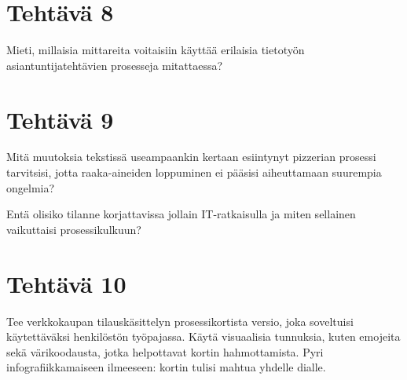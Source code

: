 \documentclass[
  finnish,
  letterpaper,
  DIV=11,
  numbers=noendperiod,
  oneside]{scrreprt}
\begin{document}
\section{Tehtävä 8}\label{tehtuxe4vuxe4-8}

Mieti, millaisia mittareita voitaisiin käyttää erilaisia tietotyön
asiantuntijatehtävien prosesseja mitattaessa?

\section{Tehtävä 9}\label{tehtuxe4vuxe4-9}

Mitä muutoksia tekstissä useampaankin kertaan esiintynyt pizzerian
prosessi tarvitsisi, jotta raaka-aineiden loppuminen ei pääsisi
aiheuttamaan suurempia ongelmia?

Entä olisiko tilanne korjattavissa jollain IT-ratkaisulla ja miten
sellainen vaikuttaisi prosessikulkuun?

\section{Tehtävä 10}\label{tehtuxe4vuxe4-10}

Tee verkkokaupan tilauskäsittelyn prosessikortista versio, joka
soveltuisi käytettäväksi henkilöstön työpajassa. Käytä visuaalisia
tunnuksia, kuten emojeita sekä värikoodausta, jotka helpottavat kortin
hahmottamista. Pyri infografiikkamaiseen ilmeeseen: kortin tulisi mahtua
yhdelle dialle.
\end{document}
